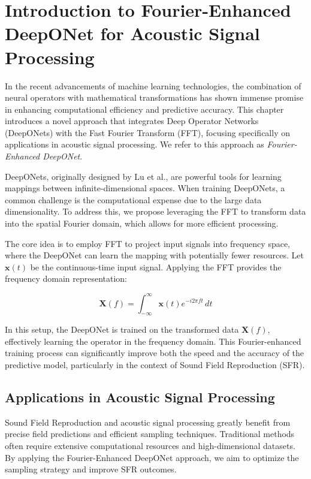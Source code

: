 \chapter{Introduction to Fourier-Enhanced DeepONet for Acoustic Signal Processing}

In the recent advancements of machine learning technologies, the combination of neural operators with mathematical transformations has shown immense promise in enhancing computational efficiency and predictive accuracy. This chapter introduces a novel approach that integrates Deep Operator Networks (DeepONets) with the Fast Fourier Transform (FFT), focusing specifically on applications in acoustic signal processing. We refer to this approach as \textit{Fourier-Enhanced DeepONet}.

DeepONets, originally designed by Lu et al., are powerful tools for learning mappings between infinite-dimensional spaces. When training DeepONets, a common challenge is the computational expense due to the large data dimensionality. To address this, we propose leveraging the FFT to transform data into the spatial Fourier domain, which allows for more efficient processing.

The core idea is to employ FFT to project input signals into frequency space, where the DeepONet can learn the mapping with potentially fewer resources. Let \( \mathbf{x}(t) \) be the continuous-time input signal. Applying the FFT provides the frequency domain representation:

\[
\mathbf{X}(f) = \int_{-\infty}^{\infty} \mathbf{x}(t) e^{-i 2 \pi f t} \, dt
\]

In this setup, the DeepONet is trained on the transformed data \( \mathbf{X}(f) \), effectively learning the operator in the frequency domain. This Fourier-enhanced training process can significantly improve both the speed and the accuracy of the predictive model, particularly in the context of Sound Field Reproduction (SFR).

\section{Applications in Acoustic Signal Processing}

Sound Field Reproduction and acoustic signal processing greatly benefit from precise field predictions and efficient sampling techniques. Traditional methods often require extensive computational resources and high-dimensional datasets. By applying the Fourier-Enhanced DeepONet approach, we aim to optimize the sampling strategy and improve SFR outcomes.


